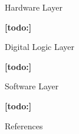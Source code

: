 \documentclass{matthijs}
\begin{document}
	\begin{hoofdstuk}{Hardware Layer}

		\textbf{[todo:]}

	\end{hoofdstuk}

	\begin{hoofdstuk}{Digital Logic Layer}

		\textbf{[todo:]}

	\end{hoofdstuk}
	
	\begin{hoofdstuk}{Software Layer}

		\textbf{[todo:]}

	\end{hoofdstuk}
	
	\begin{hoofdstuk}{References}

		\printbibliography[heading=none]

	\end{hoofdstuk}

	\clearpage
	\thispagestyle{empty}
	\addtocounter{page}{-1}
	\
	\clearpage
\end{document}
